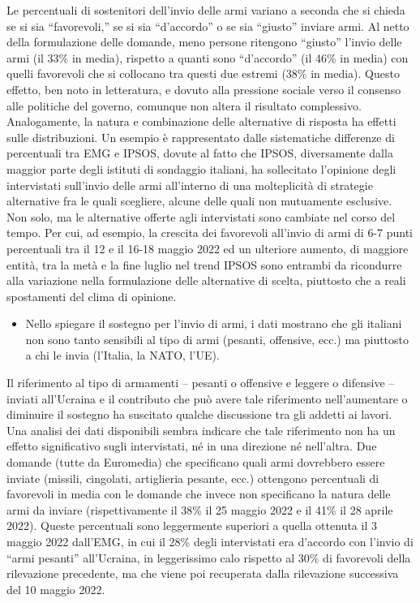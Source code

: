 \documentclass[
  openany]{book}
\providecommand{\tightlist}{%
  \setlength{\itemsep}{0pt}\setlength{\parskip}{0pt}}
\begin{document}
Le percentuali di sostenitori dell'invio delle armi variano a seconda che si chieda se si sia ``favorevoli,'' se si sia ``d'accordo'' o se sia ``giusto'' inviare armi. Al netto della formulazione delle domande, meno persone ritengono ``giusto'' l'invio delle armi (il 33\% in media), rispetto a quanti sono ``d'accordo'' (il 46\% in media) con quelli favorevoli che si collocano tra questi due estremi (38\% in media). Questo effetto, ben noto in letteratura, e dovuto alla pressione sociale verso il consenso alle politiche del governo, comunque non altera il risultato complessivo. Analogamente, la natura e combinazione delle alternative di risposta ha effetti sulle distribuzioni. Un esempio è rappresentato dalle sistematiche differenze di percentuali tra EMG e IPSOS, dovute al fatto che IPSOS, diversamente dalla maggior parte degli istituti di sondaggio italiani, ha sollecitato l'opinione degli intervistati sull'invio delle armi all'interno di una molteplicità di strategie alternative fra le quali scegliere, alcune delle quali non mutuamente esclusive. Non solo, ma le alternative offerte agli intervistati sono cambiate nel corso del tempo. Per cui, ad esempio, la crescita dei favorevoli all'invio di armi di 6-7 punti percentuali tra il 12 e il 16-18 maggio 2022 ed un ulteriore aumento, di maggiore entità, tra la metà e la fine luglio nel trend IPSOS sono entrambi da ricondurre alla variazione nella formulazione delle alternative di scelta, piuttosto che a reali spostamenti del clima di opinione.

\begin{itemize}
\tightlist
\item
  Nello spiegare il sostegno per l'invio di armi, i dati mostrano che gli italiani non sono tanto sensibili al tipo di armi (pesanti, offensive, ecc.) ma piuttosto a chi le invia (l'Italia, la NATO, l'UE).
\end{itemize}

Il riferimento al tipo di armamenti -- pesanti o offensive e leggere o difensive -- inviati all'Ucraina e il contributo che può avere tale riferimento nell'aumentare o diminuire il sostegno ha suscitato qualche discussione tra gli addetti ai lavori. Una analisi dei dati disponibili sembra indicare che tale riferimento non ha un effetto significativo sugli intervistati, né in una direzione né nell'altra. Due domande (tutte da Euromedia) che specificano quali armi dovrebbero essere inviate (missili, cingolati, artiglieria pesante, ecc.) ottengono percentuali di favorevoli in media con le domande che invece non specificano la natura delle armi da inviare (rispettivamente il 38\% il 25 maggio 2022 e il 41\% il 28 aprile 2022). Queste percentuali sono leggermente superiori a quella ottenuta il 3 maggio 2022 dall'EMG, in cui il 28\% degli intervistati era d'accordo con l'invio di ``armi pesanti'' all'Ucraina, in leggerissimo calo rispetto al 30\% di favorevoli della rilevazione precedente, ma che viene poi recuperata dalla rilevazione successiva del 10 maggio 2022.
\end{document}
